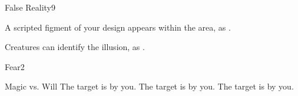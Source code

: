 \begin{spellsection}{False Reality}{9}
\begin{spellheader}
\end{spellheader}
\begin{spellcontent}
    \begin{spelltargetinginfo}
    \end{spelltargetinginfo}
    \begin{spelleffects}
        \spelleffect A scripted figment of your design appears within the area, as .
        \spelldur \durlong \dismissable
    \end{spelleffects}
\end{spellcontent}
\begin{spellfooter}
    \spellnotes Creatures can identify the illusion, as .
\end{spellfooter}
\end{spellsection}

\begin{spellsection}{Fear}{2}
\begin{spellheader}
\end{spellheader}
\begin{spellcontent}
    \begin{spelltargetinginfo}
    \end{spelltargetinginfo}
    \begin{spelleffects}
        \begin{spellattack}{Magic vs. Will}
            \spellsuccess The target is \frightened by you.
            \spellcritical The target is \panicked by you.
            \spellfailure The target is \shaken by you.
        \end{spellattack}
        \spelldur \durshort \dismissable
    \end{spelleffects}
\end{spellcontent}
\begin{spellfooter}
\end{spellfooter}
\end{spellsection}

